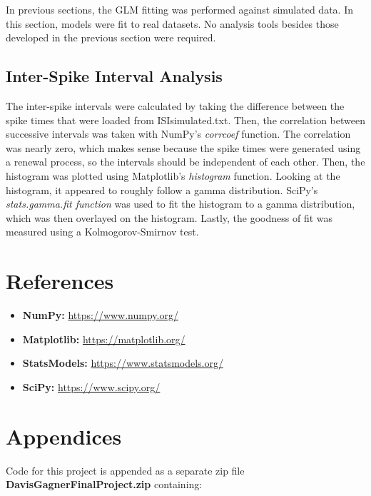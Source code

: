 \documentclass[letterpaper,titlepage,10pt]{article}
\begin{document}
In previous sections, the GLM fitting was performed against simulated data. In this section, models were fit to real
datasets. No analysis tools besides those developed in the previous section were required.

\subsection{Inter-Spike Interval Analysis}

The inter-spike intervals were calculated by taking the difference between the spike times that were loaded from
ISIsimulated.txt. Then, the correlation between successive intervals was taken with NumPy's \textit{corrcoef} function.
The correlation was nearly zero, which makes sense because the spike times were generated using a renewal process,
so the intervals should be independent of each other. Then, the histogram was plotted using Matplotlib's \textit{histogram}
function. Looking at the histogram, it appeared to roughly follow a gamma distribution. SciPy's \textit{stats.gamma.fit function}
was used to fit the histogram to a gamma distribution, which was then overlayed on the histogram. Lastly, the
goodness of fit was measured using a Kolmogorov-Smirnov test.

\section{References}

\begin{itemize}
\item \textbf{NumPy:} \url{https://www.numpy.org/}
\item \textbf{Matplotlib:} \url{https://matplotlib.org/}
\item \textbf{StatsModels:} \url{https://www.statsmodels.org/}
\item \textbf{SciPy:} \url{https://www.scipy.org/}
\end{itemize}

\section{Appendices}

Code for this project is appended as a separate zip file \textbf{DavisGagnerFinalProject.zip} containing:
\end{document}
